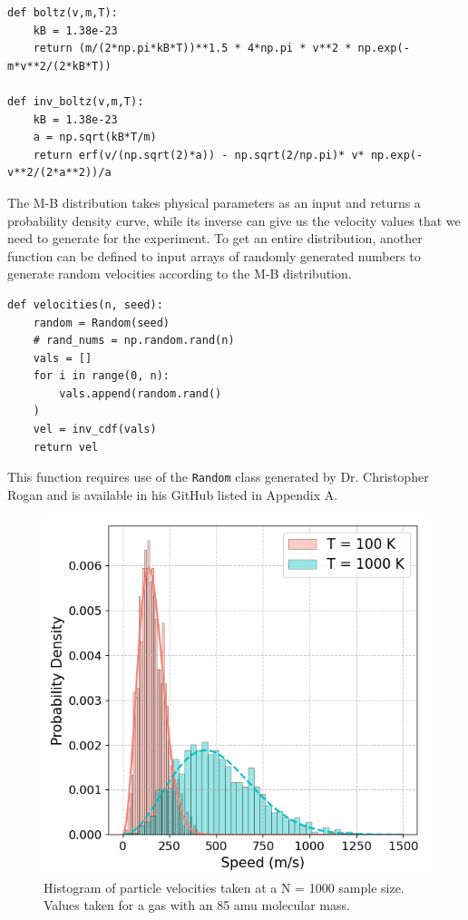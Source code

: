 \documentclass[%
 reprint,
 amsmath,amssymb,
 aps,
]{revtex4-2}
\begin{document}
\begin{lstlisting}
def boltz(v,m,T):
    kB = 1.38e-23
    return (m/(2*np.pi*kB*T))**1.5 * 4*np.pi * v**2 * np.exp(-m*v**2/(2*kB*T))

def inv_boltz(v,m,T):
    kB = 1.38e-23
    a = np.sqrt(kB*T/m)
    return erf(v/(np.sqrt(2)*a)) - np.sqrt(2/np.pi)* v* np.exp(-v**2/(2*a**2))/a
\end{lstlisting}
The M-B distribution takes physical parameters as an input and returns a probability density curve, while its inverse can give us the velocity values that we need to generate for the experiment. To get an entire distribution, another function can be defined to input arrays of randomly generated numbers to generate random velocities according to the M-B distribution.

\begin{lstlisting}
def velocities(n, seed):
    random = Random(seed)
    # rand_nums = np.random.rand(n)
    vals = []
    for i in range(0, n):
        vals.append(random.rand()
    )
    vel = inv_cdf(vals)
    return vel
\end{lstlisting}
This function requires use of the \lstinline{Random} class generated by Dr. Christopher Rogan and is available in his GitHub listed in Appendix A. 


\begin{figure}[h]
\caption{Histogram of particle velocities taken at a N = 1000 sample size. Values taken for a gas with an 85 amu molecular mass.}
\centering
	\includegraphics[scale=0.51]{code1}
\end{figure}
\end{document}
